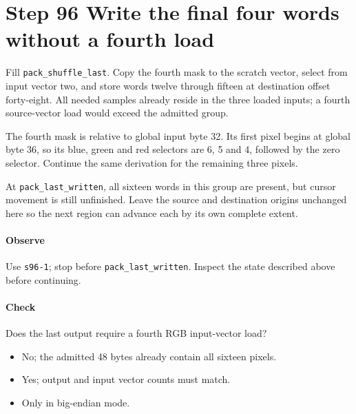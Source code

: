 \section{Step 96 Write the final four words without a fourth load}
Fill \texttt{pack\_shuffle\_last}. Copy the fourth mask to the scratch vector, select from input vector two, and store words twelve through fifteen at destination offset forty-eight. All needed samples already reside in the three loaded inputs; a fourth source-vector load would exceed the admitted group.

The fourth mask is relative to global input byte 32. Its first pixel begins at global byte 36, so its blue, green and red selectors are 6, 5 and 4, followed by the zero selector. Continue the same derivation for the remaining three pixels.

At \texttt{pack\_last\_written}, all sixteen words in this group are present, but cursor movement is still unfinished. Leave the source and destination origins unchanged here so the next region can advance each by its own complete extent.

\paragraph{Observe} Use \texttt{s96-1}; stop before \texttt{pack\_last\_written}. Inspect the state described above before continuing.

\paragraph{Check} Does the last output require a fourth RGB input-vector load?
\begin{itemize}
\item[A.] No; the admitted 48 bytes already contain all sixteen pixels.
\item[B.] Yes; output and input vector counts must match.
\item[C.] Only in big-endian mode.
\end{itemize}
